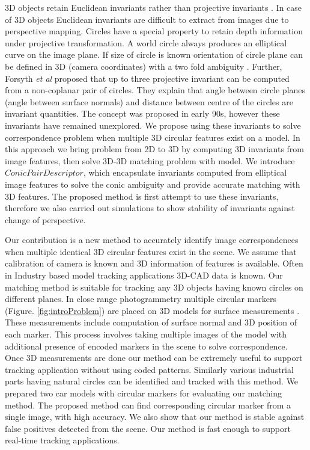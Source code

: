 \documentclass{bmvc2k}
\def\etal{\emph{et al}\bmvaOneDot}
\begin{document}
3D objects retain Euclidean invariants rather than projective invariants \cite{forsyth_91}. 
In case of 3D objects Euclidean invariants are difficult to extract from images due to perspective mapping. 
Circles have a special property to retain depth information under projective transformation.
A world circle always produces an elliptical curve on the image plane.
If size of circle is known orientation of circle plane can be defined in 3D (camera coordinates) with a two fold ambiguity \cite{forsyth_91} \cite{safaee-rad_three-dimensional_1992}. 
Further, Forsyth \etal \cite{forsyth_91} proposed that up to three projective invariant can be computed from a non-coplanar pair of circles.
They explain that angle between circle planes (angle between surface normals) and distance between centre of the circles are invariant quantities.
The concept was proposed in early 90s, however these invariants have remained unexplored. 
We propose using these invariants to solve correspondence problem when multiple 3D circular features exist on a model. 
In this approach we bring problem from 2D to 3D by computing 3D invariants from image features, then solve 3D-3D matching problem with model.
We introduce $ Conic Pair Descriptor $, which encapsulate invariants computed from elliptical image features to solve the conic ambiguity and provide accurate matching with 3D features. 
The proposed method is first attempt to use these invariants, therefore we also carried out simulations to show stability of invariants against change of perspective.  

Our contribution is a new method to accurately identify image correspondences when multiple identical 3D circular features exist in the scene. We assume that calibration of camera is known and 3D information of features is available. 
Often in Industry based model tracking applications 3D-CAD data is known. Our matching method is suitable for tracking any 3D objects having known circles on different planes. In close range photogrammetry multiple circular markers (Figure. \ref{fig:introProblem}) are placed on 3D models for surface measurements \cite{luhmann_close_2006}. 
These measurements include computation of surface normal and 3D position of each marker. 
This process involves taking multiple images of the model with additional presence of encoded markers in the scene to solve correspondence. 
Once 3D measurements are done our method can be extremely useful to support tracking application without using coded patterns. Similarly various industrial parts having natural circles can be identified and tracked with this method. 
We prepared two car models with circular markers for evaluating our matching method. The proposed method can find corresponding circular marker from a single image, with high accuracy. We also show that our method is stable against false positives detected from the scene. Our method is fast enough to support real-time tracking applications. 
\end{document}
